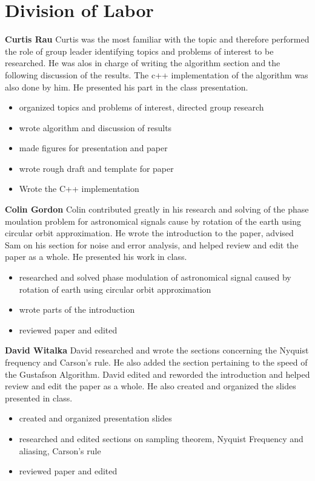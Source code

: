 \documentclass[onecolumn, groupedaddress, 10pt]{revtex4-1}
\begin{document}

\pagebreak

\section*{Division of Labor}
\textbf{Curtis Rau}
Curtis was the most familiar with the topic and therefore performed the role of group leader identifying topics and problems of interest to be researched. He was alos in charge of writing the algorithm section and the following discussion of the results. The c++ implementation of the algorithm was also done by him. He presented his part in the class presentation.
\begin{itemize}
\item organized topics and problems of interest, directed group research
\item wrote algorithm and discussion of results
\item made figures for presentation and paper
\item wrote rough draft and template for paper
\item Wrote the C++ implementation
\end{itemize}


\textbf{Colin Gordon}
Colin contributed greatly in his research and solving of the phase moulation problem for astronomical signals cause by rotation of the earth using circular orbit approximation. He wrote the introduction to the paper, advised Sam on his section for noise and error analysis, and helped review and edit the paper as a whole. He presented his work in class.
\begin{itemize}
\item researched and solved phase modulation of astronomical signal caused by rotation of earth using circular orbit approximation
\item wrote parts of the introduction
\item reviewed paper and edited
\end{itemize}

\textbf{David Witalka}
David researched and wrote the sections concerning the Nyquist frequency and Carson's rule. He also added the section pertaining to the speed of the Gustafson Algorithm. David edited and reworded the introduction and helped review and edit the paper as a whole. He also created and organized the slides presented in class.
\begin{itemize}
\item created and organized presentation slides
\item researched and edited sections on sampling theorem, Nyquist Frequency and aliasing, Carson’s rule
\item reviewed paper and edited
\end{itemize}
\end{document}
